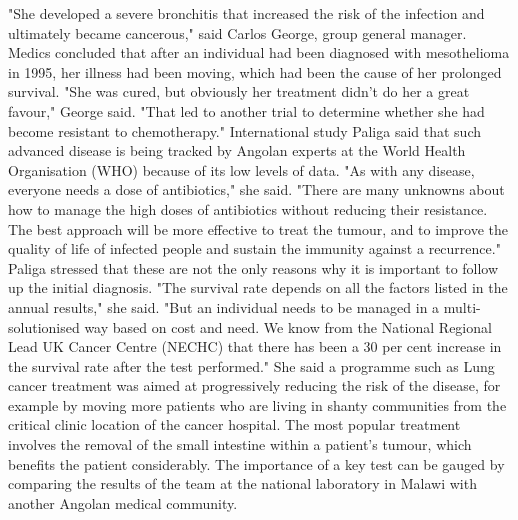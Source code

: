 \documentclass{article}%
\begin{document}
"She developed a severe bronchitis that increased the risk of the infection and ultimately became cancerous," said Carlos George, group general manager.\newline%
Medics concluded that after an individual had been diagnosed with mesothelioma in 1995, her illness had been moving, which had been the cause of her prolonged survival.\newline%
"She was cured, but obviously her treatment didn't do her a great favour," George said.\newline%
"That led to another trial to determine whether she had become resistant to chemotherapy."\newline%
International study\newline%
Paliga said that such advanced disease is being tracked by Angolan experts at the World Health Organisation (WHO) because of its low levels of data.\newline%
"As with any disease, everyone needs a dose of antibiotics," she said.\newline%
"There are many unknowns about how to manage the high doses of antibiotics without reducing their resistance. The best approach will be more effective to treat the tumour, and to improve the quality of life of infected people and sustain the immunity against a recurrence."\newline%
Paliga stressed that these are not the only reasons why it is important to follow up the initial diagnosis.\newline%
"The survival rate depends on all the factors listed in the annual results," she said.\newline%
"But an individual needs to be managed in a multi{-}solutionised way based on cost and need. We know from the National Regional Lead UK Cancer Centre (NECHC) that there has been a 30 per cent increase in the survival rate after the test performed."\newline%
She said a programme such as Lung cancer treatment was aimed at progressively reducing the risk of the disease, for example by moving more patients who are living in shanty communities from the critical clinic location of the cancer hospital.\newline%
The most popular treatment involves the removal of the small intestine within a patient's tumour, which benefits the patient considerably.\newline%
The importance of a key test can be gauged by comparing the results of the team at the national laboratory in Malawi with another Angolan medical community.\newline%
\end{document}
